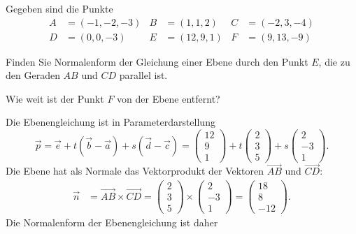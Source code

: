 Gegeben sind die Punkte 
\[
\begin{aligned}
A&=(-1,-2,-3)&
B&=(1,1,2)   &
C&=(-2,3,-4) \\
D&=(0,0,-3)  &
E&=(12,9,1)  &
F&=(9,13,-9)
\end{aligned}
\]
\begin{teilaufgaben}
\item
Finden Sie Normalenform der Gleichung einer Ebene durch den Punkt $E$,
die zu den Geraden $AB$ und $CD$ parallel ist.
\item
Wie weit ist der Punkt $F$ von der Ebene entfernt?
\end{teilaufgaben}


\begin{loesung}
\begin{teilaufgaben}
\item
Die Ebenengleichung ist in Parameterdarstellung 
\[
\vec{p}
=
\vec{e}+t(\vec{b}-\vec{a})+s(\vec{d}-\vec{c})
=
\begin{pmatrix}12\\9\\1\end{pmatrix}
+t
\begin{pmatrix}2\\3\\5\end{pmatrix}
+s
\begin{pmatrix}2\\-3\\1\end{pmatrix}.
\]
Die Ebene hat als Normale das Vektorprodukt der Vektoren $\overrightarrow{AB}$
und $\overrightarrow{CD}$:
\begin{align*}
\vec{n}
&=
\overrightarrow{AB}
\times
\overrightarrow{CD}
=
\begin{pmatrix}2\\3\\5\end{pmatrix}
\times
\begin{pmatrix}2\\-3\\1\end{pmatrix}
=
\begin{pmatrix} 18\\8\\-12 \end{pmatrix}.
\end{align*}
Die Normalenform der Ebenengleichung ist daher
\begin{equation}

\end{equation}
\end{teilaufgaben}
\end{loesung}
